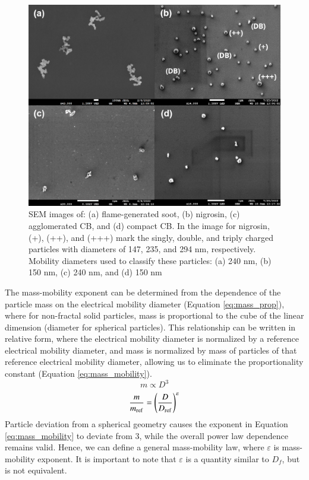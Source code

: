 \begin{figure}[htp]
\centering
\includegraphics[width=\textwidth]{fig_sem.png}
\caption{SEM images of: (a) flame-generated soot, (b) nigrosin, (c) agglomerated CB, and (d) compact CB. In the image for nigrosin, (+), (++), and (+++) mark the singly, double, and triply charged particles with diameters of 147, 235, and 294 nm, respectively. Mobility diameters used to classify these particles: (a) 240 nm, (b) 150 nm, (c) 240 nm, and (d) 150 nm}
\label{fig:sem}
\end{figure}

The mass-mobility exponent can be determined from the dependence of the particle mass on the electrical mobility diameter (Equation \ref{eq:mass_prop}), where for non-fractal solid particles, mass is proportional to the cube of the linear dimension (diameter for spherical particles). This relationship can be written in relative form, where the electrical mobility diameter is normalized by a reference electrical mobility diameter, and mass is normalized by mass of particles of that reference electrical mobility diameter, allowing us to eliminate the proportionality constant (Equation \ref{eq:mass_mobility}).
\begin{equation}
    \label{eq:mass_prop}
    m\propto D^3
\end{equation}
\begin{equation}
    \label{eq:mass_mobility}
    \frac{m}{m_{\rm ref}}=\left(\frac{D}{D_{\rm ref}}\right)^\varepsilon
\end{equation}
Particle deviation from a spherical geometry causes the exponent in Equation \ref{eq:mass_mobility} to deviate from 3, while the overall power law dependence remains valid. Hence, we can define a general mass-mobility law, where $\varepsilon$ is mass-mobility exponent. It is important to note that $\varepsilon$ is a quantity similar to $D_f$, but is not equivalent.

